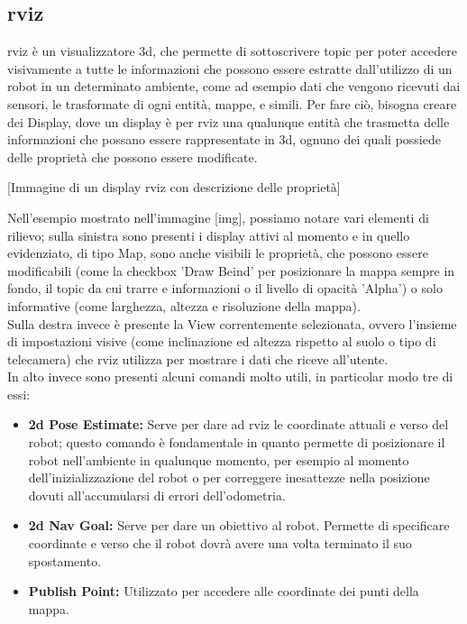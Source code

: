 \documentclass[Lau]{sapthesis}
\begin{document}
\subsection{rviz}
rviz è un visualizzatore 3d, che permette di sottoscrivere topic per poter accedere visivamente a tutte le informazioni che possono essere estratte dall'utilizzo di un robot in un determinato ambiente, come ad esempio dati che vengono ricevuti dai sensori, le trasformate di ogni entità, mappe, e simili. Per fare ciò, bisogna creare dei Display, dove un display è per rviz una qualunque entità che trasmetta delle informazioni che possano essere rappresentate in 3d, ognuno dei quali possiede delle proprietà che possono essere modificate.
\begin{center}
[Immagine di un display rviz con descrizione delle proprietà]
\end{center}
Nell'esempio mostrato nell'immagine [img], possiamo notare vari elementi di rilievo; sulla sinistra sono presenti i display attivi al momento e in quello evidenziato, di tipo Map, sono anche visibili le proprietà, che possono essere modificabili (come la checkbox 'Draw Beind' per posizionare la mappa sempre in fondo, il topic da cui trarre e informazioni o il livello di opacità 'Alpha') o solo informative (come larghezza, altezza e risoluzione della mappa).\\ Sulla destra invece è presente la View correntemente selezionata, ovvero l'insieme di impostazioni visive (come inclinazione ed altezza rispetto al suolo o tipo di telecamera) che rviz utilizza per mostrare i dati che riceve all'utente.\\ In alto invece sono presenti alcuni comandi molto utili, in particolar modo tre di essi:
\begin{itemize}
\item \textbf{2d Pose Estimate: } Serve per dare ad rviz le coordinate attuali e verso del robot; questo comando è fondamentale in quanto permette di posizionare il robot nell'ambiente in qualunque momento, per esempio al momento dell'inizializzazione del robot o per correggere inesattezze nella posizione dovuti all'accumularsi di errori dell'odometria.
\item \textbf{2d Nav Goal: } Serve per dare un obiettivo al robot. Permette di specificare coordinate e verso che il robot dovrà avere una volta terminato il suo spostamento. 
\item \textbf{Publish Point: } Utilizzato per accedere alle coordinate dei punti della mappa. 
\end{itemize}
\end{document}
